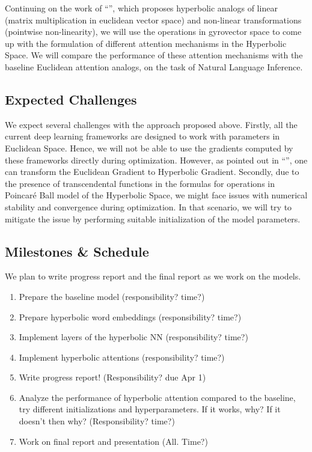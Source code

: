 \documentclass[11pt,a4paper]{article}
\begin{document}
Continuing on the work of ``'', which proposes hyperbolic analogs of linear (matrix multiplication in euclidean vector space) and non-linear transformations (pointwise non-linearity), we will use the operations in gyrovector space \cite{ungar2005} to come up with the formulation of different attention mechanisms in the Hyperbolic Space. We will compare the performance of these attention mechanisms with the baseline Euclidean attention analogs, on the task of Natural Language Inference.

\subsection{Expected Challenges}

We expect several challenges with the approach proposed above. Firstly, all the current deep learning frameworks are designed to work with parameters in Euclidean Space. Hence, we will not be able to use the gradients computed by these frameworks directly during optimization. However, as pointed out in ``'', one can transform the Euclidean Gradient to Hyperbolic Gradient. Secondly, due to the presence of transcendental functions in the formulas for operations in Poincar\'e Ball model of the Hyperbolic Space, we might face issues with numerical stability and convergence during optimization. In that scenario, we will try to mitigate the issue by performing suitable initialization of the model parameters. 


\subsection{Milestones \& Schedule}
We plan to write progress report and the final report as we work on the models. 
\begin{enumerate}
    \item Prepare the baseline model (responsibility? time?)
    \item Prepare hyperbolic word embeddings (responsibility? time?)
    \item Implement layers of the hyperbolic NN (responsibility? time?)
    \item Implement hyperbolic attentions (responsibility? time?)
    \item Write progress report! (Responsibility? due Apr 1)
    \item Analyze the performance of hyperbolic attention compared to the baseline, try different initializations and hyperparameters. If it works, why? If it doesn't then why? (Responsibility? time?)
    \item Work on final report and presentation (All. Time?)
\end{enumerate}
\end{document}
